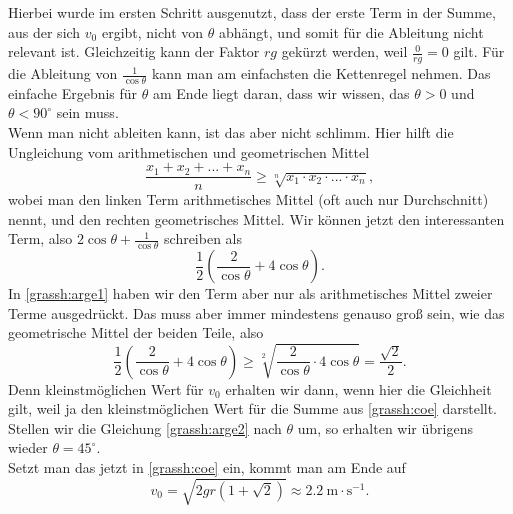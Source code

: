 \begin{Answer}
\begin{equation}
	\end{equation}
	Hierbei wurde im ersten Schritt ausgenutzt, dass der erste Term in der Summe, aus der sich $v_0$ ergibt, nicht von $\theta$ abhängt, und somit für die Ableitung nicht relevant ist. Gleichzeitig kann der Faktor $rg$ gekürzt werden, weil $\frac{0}{rg} = 0$ gilt. Für die Ableitung von $\frac{1}{\cos \theta}$ kann man am einfachsten die Kettenregel nehmen. Das einfache Ergebnis für $\theta$ am Ende liegt daran, dass wir wissen, das $\theta>0$ und $\theta<90^\circ$ sein muss.\\
	Wenn man nicht ableiten kann, ist das aber nicht schlimm. Hier hilft die Ungleichung vom arithmetischen und geometrischen Mittel
	\begin{equation}\label{grassh:arge}
	\frac{x_1+x_2+...+x_n}{n}\geq \sqrt[n]{x_1\cdot x_2 \cdot ... \cdot x_n},
	\end{equation} 
	wobei man den linken Term arithmetisches Mittel (oft auch nur Durchschnitt) nennt, und den rechten geometrisches Mittel.
	Wir können jetzt den interessanten Term, also $2 \cos \theta + \frac{1}{\cos \theta}$ schreiben als 
	\begin{equation}\label{grassh:arge1}
		\frac{1}{2}\left(\frac{2}{\cos \theta} + 4 \cos \theta\right).
	\end{equation}
	In \eqref{grassh:arge1} haben wir den Term aber nur als arithmetisches Mittel zweier Terme ausgedrückt. Das muss aber immer mindestens genauso groß sein, wie das geometrische Mittel der beiden Teile, also
	\begin{equation}\label{grassh:arge2}
		\frac{1}{2}\left(\frac{2}{\cos \theta} + 4 \cos \theta\right) \geq \sqrt[2]{\frac{2}{\cos \theta}\cdot 4 \cos \theta} = \frac{\sqrt{2}}{2}.
	\end{equation}
	Denn kleinstmöglichen Wert für $v_0$ erhalten wir dann, wenn hier die Gleichheit gilt, weil ja den kleinstmöglichen Wert für die Summe aus \eqref{grassh:coe} darstellt. Stellen wir die Gleichung \eqref{grassh:arge2} nach $\theta$ um, so erhalten wir übrigens wieder $\theta = 45^\circ$.\\
	Setzt man das jetzt in \eqref{grassh:coe} ein, kommt man am Ende auf
	\begin{equation*}
		\boxed{
		v_0 = \sqrt{2gr\left(1+\sqrt{2}\right)}\approx 2.2~\mathrm{m\cdot s^{-1}}.}
	\end{equation*}
\end{Answer}
